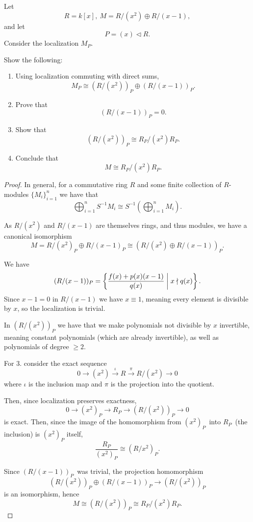 \documentclass[11pt]{article}
\begin{document}
\begin{prob}
    Let 
    \[
        R = k[x], \ M = R/(x^2) \oplus R/(x-1), 
    \]
    and let 
    \[
        P = (x) \triangleleft R. 
    \]
    Consider the localization $M_P$. 

    Show the following: 
    \begin{enumerate}
        \item Using localization commuting with direct sums, 
            \[
                M_P \cong (R/(x^2))_P \oplus (R/(x-1))_P. 
            \]
        \item Prove that 
            \[
                (R/(x-1))_P = 0. 
            \]
        \item Show that 
            \[
                (R/(x^2))_P \cong R_P/(x^2)R_P. 
            \]
        \item Conclude that 
            \[
                M \cong R_P/(x^2)R_P.
            \]
    \end{enumerate}
\end{prob}
\begin{proof}
    In general, for a commutative ring $R$ and some 
    finite collection of $R$-modules $\{M_i\}_{i=1}^n$ 
    we have that 
    \[
        \bigoplus_{i=1}^n S^{-1}M_i 
        \cong S^{-1} \left(\bigoplus_{i=1}^n M_i \right). 
    \]

    As $R/(x^2)$ and $R/(x-1)$ are themselves rings, and 
    thus modules, we have a canonical isomorphism 
    \[
        M = R/(x^2)_P \oplus R/(x-1)_P 
        \cong (R/(x^2) \oplus R/(x-1))_P. 
    \]

    We have 
    \[
        (R/(x-1))_P 
        = \left\{\frac{f(x) + p(x)(x-1)}{q(x)} \biggm| 
        x \nmid q(x)\right\}. 
    \]
    Since $x - 1 = 0$ in $R/(x-1)$ we have 
    $x \equiv 1$, meaning every element is divisible 
    by $x$, so the localization is trivial.  

    In $(R/(x^2))_P$ we have that we make 
    polynomials not divisible by $x$ 
    invertible, meaning constant polynomials (which 
    are already invertible), as well as polynomials 
    of degree $\geq 2$. 

    For $3.$ consider the exact sequence 
    \[
        0 \to (x^2) \overset\iota\to R \overset\pi\to R/(x^2) \to 0
    \]
    where $\iota$ is the inclusion map and $\pi$ is the 
    projection into the quotient. 

    Then, since localization preserves exactness, 
    \[
        0 \to (x^2)_P \to R_P \to (R/(x^2))_P \to 0 
    \]
    is exact. Then, since the image of the 
    homomorphism from $(x^2)_P$ into $R_P$ (the inclusion) 
    is $(x^2)_P$ itself, 
    \[
        \frac{R_P}{(x^2)_P} \cong (R/x^2)_P. 
    \]

    Since $(R/(x-1))_P$ was trivial, the projection 
    homomorphism 
    \[
        (R/(x^2))_P \oplus (R/(x-1))_P 
        \to (R/(x^2))_P
    \]
    is an isomorphism, 
    hence 
    \[
        M \cong (R/(x^2))_P \cong R_P/(x^2)R_P.
    \]
\end{proof}
\end{document}
